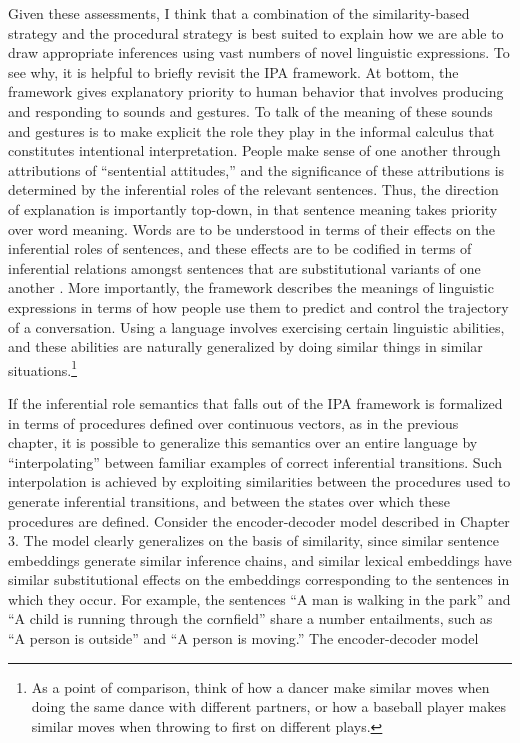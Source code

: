 Given these assessments, I think that a combination of the similarity-based strategy and the procedural strategy is best suited to explain how we are able to draw appropriate inferences using vast numbers of novel linguistic expressions. To see why, it is helpful to briefly revisit the IPA framework. At bottom, the framework gives explanatory priority to human behavior that involves producing and responding to sounds and gestures. To talk of the meaning of these sounds and gestures is to make explicit the role they play in the informal calculus that constitutes intentional interpretation. People make sense of one another through attributions of ``sentential attitudes,'' and the significance of these attributions is determined by the inferential roles of the relevant sentences. Thus, the direction of explanation is importantly top-down, in that sentence meaning takes priority over word meaning. Words are to be understood in terms of their effects on the inferential roles of sentences, and these effects are to be codified in terms of inferential relations amongst sentences that are substitutional variants of one another \citep{Brandom:1994}. More importantly, the framework describes the meanings of linguistic expressions in terms of how people use them to predict and control the trajectory of a conversation. Using a language involves exercising certain linguistic abilities, and these abilities are naturally generalized by doing similar things in similar situations.\footnote{As a point of comparison, think of how a dancer make similar moves when doing the same dance with different partners, or how a baseball player makes similar moves when throwing to first on different plays.}

If the inferential role semantics that falls out of the IPA framework is formalized in terms of procedures defined over continuous vectors, as in the previous chapter, it is possible to generalize this semantics over an entire language by ``interpolating'' between familiar examples of correct inferential transitions. Such interpolation is achieved by exploiting similarities between the procedures used to generate inferential transitions, and between the states over which these procedures are defined. Consider the encoder-decoder model described in Chapter 3. The model clearly generalizes on the basis of similarity, since similar sentence embeddings generate similar inference chains, and similar lexical embeddings have similar substitutional effects on the embeddings corresponding to the sentences in which they occur. For example, the sentences ``A man is walking in the park'' and ``A child is running through the cornfield'' share a number entailments, such as ``A person is outside'' and ``A person is moving.'' The encoder-decoder model 

